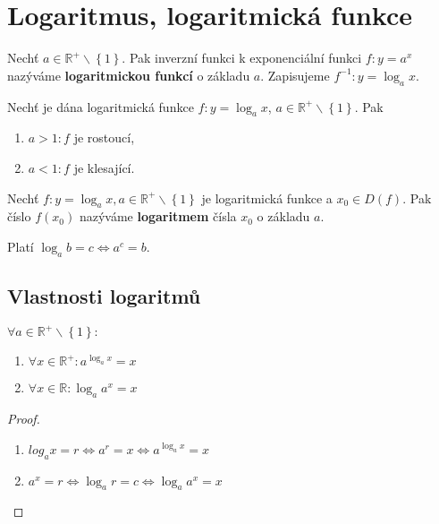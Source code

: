 \section{Logaritmus, logaritmická funkce}
\begin{definition}
    Nechť $a \in \mathbb R^+ \smallsetminus\left \{ 1 \right \} $. Pak inverzní
    funkci k exponenciální funkci $f:y=a^x$ nazýváme \textbf{logaritmickou
    funkcí} o základu $a$. Zapisujeme $f^{-1}: y=\log_a x.$
\end{definition}

\begin{veta}
    Nechť je dána logaritmická funkce $f:y=\log_a x$, $a \in \mathbb R^+ \smallsetminus
    \left \{ 1 \right \} $. Pak
    \begin{enumerate}[$i.$]
        \item $a>1: f$ je rostoucí,
       	\item $a < 1: f$ je klesající.
    \end{enumerate}
\end{veta}

\begin{definition}
    Nechť $f: y=\log_a x, a \in \mathbb R^+ \smallsetminus \left \{ 1 \right \}$ je
    logaritmická funkce a $x_0\in D(f).$ Pak číslo $f(x_0)$ nazýváme
    \textbf{logaritmem} čísla $x_0$ o základu $a.$
\end{definition}

\begin{pozn}
    Platí $\log_a b=c \iff a^c = b.$
\end{pozn}

\subsection*{Vlastnosti logaritmů}
\begin{veta}
    $\forall a \in \mathbb R^+ \smallsetminus \left \{ 1 \right \}:$
    \begin{enumerate}[$i.$]
        \item $\forall x \in \mathbb R^+: a^{\log_a x}=x$
       	\item $\forall x \in \mathbb R: \log_a a^x=x$
    \end{enumerate}
\end{veta}

\begin{proof}
    \begin{enumerate}[$i.$]
        \item $log_a x = r \iff a^r = x \iff a^{\log_a x}=x$
       	\item $a^x = r \iff \log_a r=c \iff \log_a a^x = x$ \qedhere
    \end{enumerate}
\end{proof}

